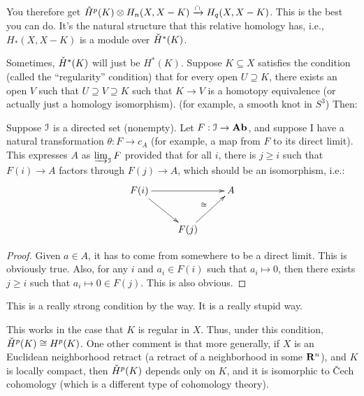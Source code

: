 You therefore get $\check{H}^p(K)\otimes H_n(X,X-K)\xrightarrow{\cap} H_q(X,X-K)$. This is the best you can do. It's the natural structure that this relative homology has, i.e., $ H_\ast(X,X-K)$ is a module over $\check{H}^\ast(K)$.

Sometimes, $\check{H}^\ast(K)$ will just be $ H^\ast(K)$. Suppose $K\subseteq X$ satisfies the condition (called the ``regularity'' condition) that for every open $U\supseteq K$, there exists an open $V$ such that $U\supseteq V\supseteq K$ such that $K\to V$ is a homotopy equivalence (or actually just a homology isomorphism). (for example, a smooth knot in $S^3$) Then:
\begin{lemma}
Suppose $\mathcal I$ is a directed set (nonempty). Let $F:\mathcal I\to\mathbf{Ab}$, and suppose I have a natural transformation $\theta:F\to c_A$ (for example, a map from $F$ to its direct limit). This expresses $A$ as $\varinjlim_\mathcal I F$ provided that for all $i$, there is $j\geq i$ such that $F(i)\to A$ factors through $F(j)\to A$, which should be an isomorphism, i.e.:
\begin{equation*}
\xymatrix{
	F(i)\ar[dr]\ar[rr] & & A\\
	& F(j)\ar[ur]^\cong
}
\end{equation*}
\end{lemma}
\begin{proof}
Given $a\in A$, it has to come from somewhere to be a direct limit. This is obviously true. Also, for any $i$ and $a_i\in F(i)$ such that $a_i\mapsto 0$, then there exists $j\geq i$ such that $a_i\mapsto 0\in F(j)$. This is also obvious.
\end{proof}
\begin{remark}
This is a really strong condition by the way. It is a really stupid way.
\end{remark}
This works in the case that $K$ is regular in $X$. Thus, under this condition, $\check{H}^p(K)\cong H^p(K)$. One other comment is that more generally, if $X$ is an Euclidean neighborhood retract (a retract of a neighborhood in some $\mathbf R^n$), and $K$ is locally compact, then $\check{H}^p(K)$ depends only on $K$, and it is isomorphic to \v{C}ech cohomology (which is a different type of cohomology theory).
